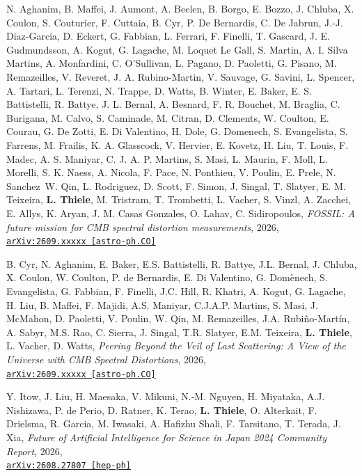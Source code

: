 \begin{minipage}{\textwidth}
N. Aghanim, B. Maffei, J. Aumont, A. Beelen, B. Borgo, E. Bozzo, J. Chluba, X. Coulon, S. Couturier, F. Cuttaia, B. Cyr, P. De Bernardis, C. De Jabrun, J.-J. Diaz-Garcia, D. Eckert, G. Fabbian, L. Ferrari, F. Finelli, T. Gascard, J. E. Gudmundsson, A. Kogut, G. Lagache, M. Loquet Le Gall, S. Martin, A. I. Silva Martins, A. Monfardini, C. O'Sullivan, L. Pagano, D. Paoletti, G. Pisano, M. Remazeilles, V. Reveret, J. A. Rubino-Martin, V. Sauvage, G. Savini, L. Spencer, A. Tartari, L. Terenzi, N. Trappe, D. Watts, B. Winter, E. Baker, E. S. Battistelli, R. Battye, J. L. Bernal, A. Besnard, F. R. Bouchet, M. Braglia, C. Burigana, M. Calvo, S. Caminade, M. Citran, D. Clements, W. Coulton, E. Courau, G. De Zotti, E. Di Valentino, H. Dole, G. Domenech, S. Evangelista, S. Farrens, M. Frailis, K. A. Glasscock, V. Hervier, E. Kovetz, H. Liu, T. Louis, F. Madec, A. S. Maniyar, C. J. A. P. Martins, S. Masi, L. Maurin, F. Moll, L. Morelli, S. K. Naess, A. Nicola, F. Pace, N. Ponthieu, V. Poulin, E. Prele, N. Sanchez\, W. Qin, L. Rodriguez, D. Scott, F. Simon, J. Singal, T. Slatyer, E. M. Teixeira, {\bf L. Thiele}, M. Tristram, T. Trombetti, L. Vacher, S. Vinzl, A. Zacchei, E. Allys, K. Aryan, J. M. Casas Gonzales, O. Lahav, C. Sidiropoulos, \emph{FOSSIL: A future mission for CMB spectral distortion measurements}, 2026,\\
\href{https://arxiv.org/abs/2609.xxxxx}{\mbox{\texttt{arXiv:2609.xxxxx [astro-ph.CO]}}}
\end{minipage}

\begin{minipage}{\textwidth}
  B. Cyr, N. Aghanim, E. Baker, E.S. Battistelli, R. Battye, J.L. Bernal, J. Chluba, X. Coulon, W. Coulton, P. de Bernardis, E. Di Valentino, G. Dom\`enech, S. Evangelista, G. Fabbian, F. Finelli, J.C. Hill, R. Khatri, A. Kogut, G. Lagache, H. Liu, B. Maffei, F. Majidi, A.S. Maniyar, C.J.A.P. Martins, S. Masi, J. McMahon, D. Paoletti, V. Poulin, W. Qin, M. Remazeilles, J.A. Rubi\~no-Mart\'in, A. Sabyr, M.S. Rao, C. Sierra, J. Singal, T.R. Slatyer, E.M. Teixeira, {\bf L. Thiele}, L. Vacher, D. Watts, \emph{Peering Beyond the Veil of Last Scattering: A View of the Universe with CMB Spectral Distortions}, 2026,\\
\href{https://arxiv.org/abs/2609.xxxxx}{\mbox{\texttt{arXiv:2609.xxxxx [astro-ph.CO]}}}
\end{minipage}

\begin{minipage}{\textwidth}
Y. Itow, J. Liu, H. Maesaka, V. Mikuni, N.-M. Nguyen, H. Miyataka, A.J. Nishizawa, P. de Perio, D. Ratner, K. Terao, {\bf L. Thiele}, O. Alterkait, F. Drielsma, R. Garcia, M. Iwasaki, A. Hafizhu Shali, F. Tarsitano, T. Terada, J. Xia, \emph{Future of Artificial Intelligence for Science in Japan 2024 Community Report}, 2026,\\
\href{https://arxiv.org/abs/2608.27807}{\mbox{\texttt{arXiv:2608.27807 [hep-ph]}}}
\end{minipage}

